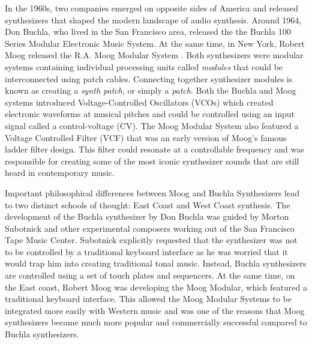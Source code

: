 In the 1960s, two companies emerged on opposite sides of America and released synthesizers that shaped the modern landscape of audio synthesis. Around 1964, Don Buchla, who lived in the San Francisco area, released the the Buchla 100 Series Modular Electronic Music System. At the same time, in New York, Robert Moog released the R.A. Moog Modular System \cite{mcguire2015musical}. Both synthesizers were modular systems containing individual processing units called \textit{modules} that could be interconnected using patch cables. Connecting together synthesizer modules is known as creating a \textit{synth patch}, or simply a \textit{patch}. Both the Buchla and Moog systems introduced Voltage-Controlled Oscillators (VCOs) which created electronic waveforms at musical pitches and could be controlled using an input signal called a control-voltage (CV). The Moog Modular System also featured a Voltage Controlled Filter (VCF) that was an early version of Moog's famous ladder filter design. This filter could resonate at a controllable frequency and was responsible for creating some of the most iconic synthesizer sounds that are still heard in contemporary music.

Important philosophical differences between Moog and Buchla Synthesizers lead to two distinct schools of thought: East Coast and West Coast synthesis. The development of the Buchla synthesizer by Don Buchla was guided by Morton Subotnick and other experimental composers working out of the San Francisco Tape Music Center. Subotnick explicitly requested that the synthesizer was not to be controlled by a traditional keyboard interface as he was worried that it would trap him into creating traditional tonal music. Instead, Buchla synthesizers are controlled using a set of touch plates and sequencers. At the same time, on the East coast, Robert Moog was developing the Moog Modular, which featured a traditional keyboard interface. This allowed the Moog Modular Systems to be integrated more easily with Western music and was one of the reasons that Moog synthesizers became much more popular and commercially successful compared to Buchla synthesizers. 

